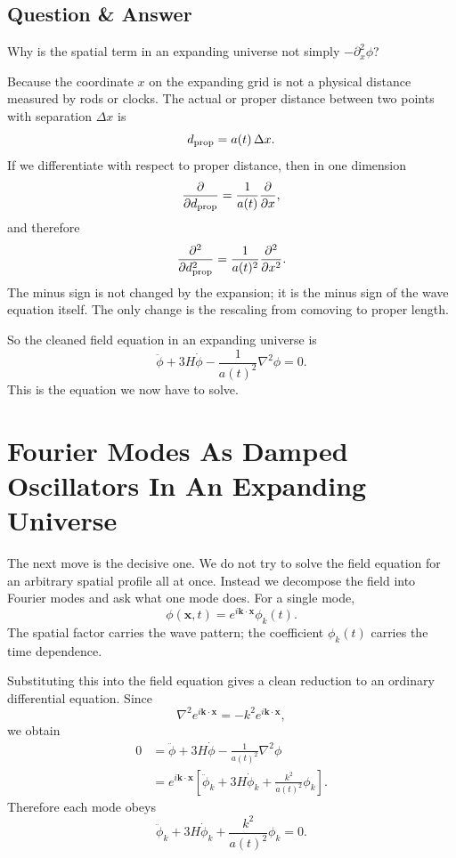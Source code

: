 \subsection{Question \& Answer}

Why is the spatial term in an expanding universe not simply \(-\partial_{x}^{2}\phi\)?

Because the coordinate \(x\) on the expanding grid is not a physical distance measured by rods or clocks. The actual or proper distance between two points with separation \(\Delta x\) is
\begin{equation}
d_{\rm prop}=a(t)\,\Delta x.
\end{equation}
If we differentiate with respect to proper distance, then in one dimension
\begin{equation}
\frac{\partial}{\partial d_{\rm prop}}=\frac{1}{a(t)}\frac{\partial}{\partial x},
\end{equation}
and therefore
\begin{equation}
\frac{\partial^{2}}{\partial d_{\rm prop}^{2}}=\frac{1}{a(t)^{2}}\frac{\partial^{2}}{\partial x^{2}}.
\end{equation}
The minus sign is not changed by the expansion; it is the minus sign of the wave equation itself. The only change is the rescaling from comoving to proper length.

So the cleaned field equation in an expanding universe is
\begin{equation}
\ddot\phi+3H\dot\phi-\frac{1}{a(t)^{2}}\nabla^{2}\phi=0.
\end{equation}
This is the equation we now have to solve.

\section{Fourier Modes As Damped Oscillators In An Expanding Universe}

The next move is the decisive one. We do not try to solve the field equation for an arbitrary spatial profile all at once. Instead we decompose the field into Fourier modes and ask what one mode does. For a single mode,
\begin{equation}
\phi(\mathbf{x},t)=e^{i\mathbf{k}\cdot\mathbf{x}}\phi_{k}(t).
\end{equation}
The spatial factor carries the wave pattern; the coefficient \(\phi_k(t)\) carries the time dependence.

Substituting this into the field equation gives a clean reduction to an ordinary differential equation. Since
\begin{equation}
\nabla^{2}e^{i\mathbf{k}\cdot\mathbf{x}}=-k^{2}e^{i\mathbf{k}\cdot\mathbf{x}},
\end{equation}
we obtain
\begin{align}
0&=\ddot\phi+3H\dot\phi-\frac{1}{a(t)^{2}}\nabla^{2}\phi\\
&=e^{i\mathbf{k}\cdot\mathbf{x}}
\left[
\ddot\phi_k+3H\dot\phi_k+\frac{k^{2}}{a(t)^{2}}\phi_k
\right].
\end{align}
Therefore each mode obeys
\begin{equation}
\ddot\phi_k+3H\dot\phi_k+\frac{k^{2}}{a(t)^{2}}\phi_k=0.
\end{equation}


